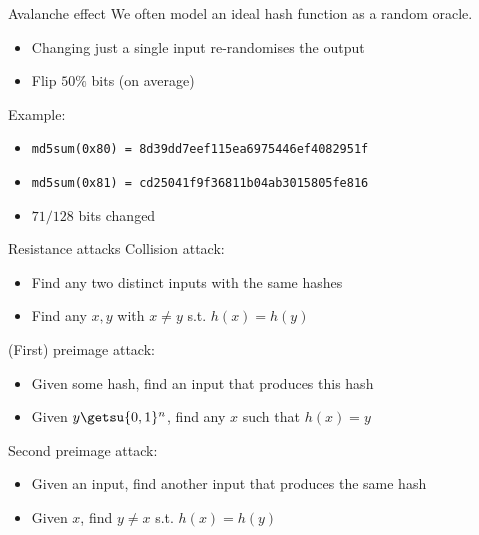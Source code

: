 \begin{frame}{Avalanche effect}
  We often model an ideal hash function as a random oracle.
  \begin{itemize}[<+(1)->]
    \item Changing just a single input re-randomises the output
    \item Flip $50\%$ bits (on average)

  \end{itemize}

  \vspace*{1em}

  \pause
  Example:
  \begin{itemize}
    \item {\small\texttt{md5sum(0x80) = 8d39dd7eef115ea6975446ef4082951f}}
    \item {\small\texttt{md5sum(0x81) = cd25041f9f36811b04ab3015805fe816}}
    \pause\item $71/128$ bits changed
  \end{itemize}
\end{frame}

\begin{frame}{Resistance attacks}
  Collision attack:
  \begin{itemize}[<+(1)->]
    \item Find any two distinct inputs with the same hashes
    \item Find any $x, y$ with $x \neq y$ s.t. $h(x) = h(y)$
  \end{itemize}

  \pause
  (First) preimage attack:
  \begin{itemize}[<+(1)->]
    \item Given some hash, find an input that produces this hash
    \item Given $y \getsu \{0,1\}^n$, find any $x$ such that $h(x) = y$
  \end{itemize}

  \pause
  Second preimage attack:
  \begin{itemize}[<+(1)->]
    \item Given an input, find another input that produces the same hash
    \item Given $x$, find $y \neq x$ s.t. $h(x) = h(y)$
  \end{itemize}
\end{frame}

